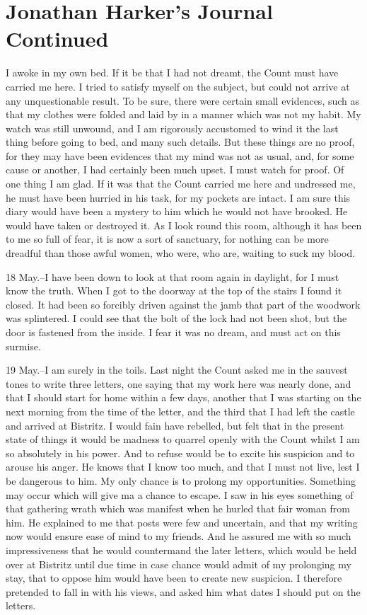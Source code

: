 \chapter{Jonathan Harker's Journal Continued}

I awoke in my own bed. If it be that I had not dreamt, the Count must have carried me here. I tried to satisfy myself on the subject, but could not arrive at any unquestionable result. To be sure, there were certain small evidences, such as that my clothes were folded and laid by in a manner which was not my habit. My watch was still unwound, and I am rigorously accustomed to wind it the last thing before going to bed, and many such details. But these things are no proof, for they may have been evidences that my mind was not as usual, and, for some cause or another, I had certainly been much upset. I must watch for proof. Of one thing I am glad. If it was that the Count carried me here and undressed me, he must have been hurried in his task, for my pockets are intact. I am sure this diary would have been a mystery to him which he would not have brooked. He would have taken or destroyed it. As I look round this room, although it has been to me so full of fear, it is now a sort of sanctuary, for nothing can be more dreadful than those awful women, who were, who are, waiting to suck my blood. 

18 May.--I have been down to look at that room again in daylight, for I must know the truth. When I got to the doorway at the top of the stairs I found it closed. It had been so forcibly driven against the jamb that part of the woodwork was splintered. I could see that the bolt of the lock had not been shot, but the door is fastened from the inside. I fear it was no dream, and must act on this surmise. 

19 May.--I am surely in the toils. Last night the Count asked me in the sauvest tones to write three letters, one saying that my work here was nearly done, and that I should start for home within a few days, another that I was starting on the next morning from the time of the letter, and the third that I had left the castle and arrived at Bistritz. I would fain have rebelled, but felt that in the present state of things it would be madness to quarrel openly with the Count whilst I am so absolutely in his power. And to refuse would be to excite his suspicion and to arouse his anger. He knows that I know too much, and that I must not live, lest I be dangerous to him. My only chance is to prolong my opportunities. Something may occur which will give ma a chance to escape. I saw in his eyes something of that gathering wrath which was manifest when he hurled that fair woman from him. He explained to me that posts were few and uncertain, and that my writing now would ensure ease of mind to my friends. And he assured me with so much impressiveness that he would countermand the later letters, which would be held over at Bistritz until due time in case chance would admit of my prolonging my stay, that to oppose him would have been to create new suspicion. I therefore pretended to fall in with his views, and asked him what dates I should put on the letters. 

